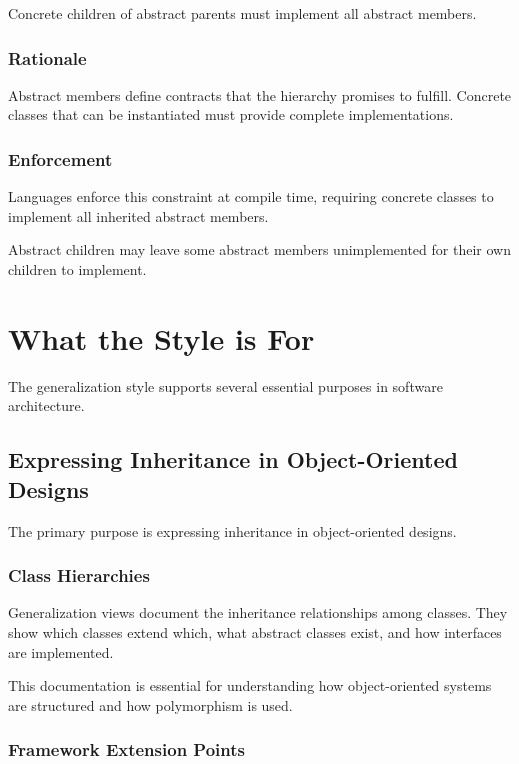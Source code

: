 \documentclass[11pt]{article}
\begin{document}
Concrete children of abstract parents must implement all abstract members.

\subsubsection{Rationale}

Abstract members define contracts that the hierarchy promises to fulfill. Concrete classes that can be instantiated must provide complete implementations.

\subsubsection{Enforcement}

Languages enforce this constraint at compile time, requiring concrete classes to implement all inherited abstract members.

Abstract children may leave some abstract members unimplemented for their own children to implement.

\section{What the Style is For}

The generalization style supports several essential purposes in software architecture.

\subsection{Expressing Inheritance in Object-Oriented Designs}

The primary purpose is expressing inheritance in object-oriented designs.

\subsubsection{Class Hierarchies}

Generalization views document the inheritance relationships among classes. They show which classes extend which, what abstract classes exist, and how interfaces are implemented.

This documentation is essential for understanding how object-oriented systems are structured and how polymorphism is used.

\subsubsection{Framework Extension Points}
\end{document}
